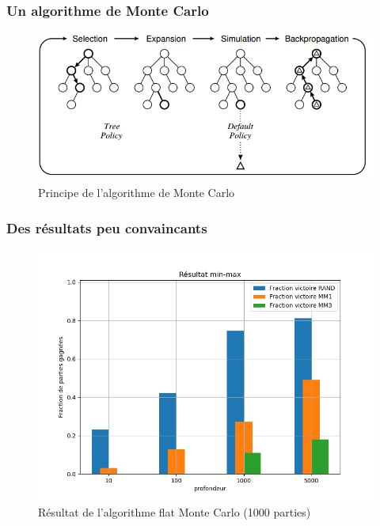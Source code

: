 \documentclass{beamer}
\begin{document}
\begin{frame}
  \frametitle{Un algorithme de Monte Carlo}
  \begin{figure}
    \centering
    \includegraphics[width=\linewidth]{ressources/monte_carlo_explication.png}
    \caption{Principe de l'algorithme de Monte Carlo}
  \end{figure}
\end{frame}

\begin{frame}
  \frametitle{Des résultats peu convaincants}
  \begin{figure}
    \centering
    \includegraphics[width=0.75\linewidth]{ressources/resultat_flat_monte_carlo.png}
    \caption{Résultat de l'algorithme flat Monte Carlo (1000 parties)}
  \end{figure}
\end{frame}
\end{document}
